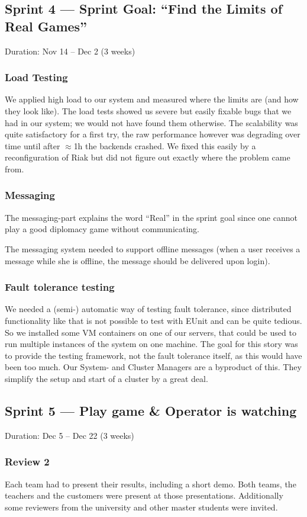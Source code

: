 \documentclass[11pt,a4paper]{report}
\begin{document}
\subsection*{Sprint 4 --- Sprint Goal: ``Find the Limits of Real Games''}
Duration: Nov 14 -- Dec 2 (3 weeks)
\subsubsection{Load Testing}
We applied high load to our system and measured where the limits are (and how
they look like). The load tests showed us severe but easily fixable bugs that we
had in our system; we would not have found them otherwise. The scalability was
quite satisfactory for a first try, the raw performance however was degrading
over time until after $\approx$1h the backends crashed. We fixed this easily by
a reconfiguration of Riak but did not figure out exactly where the problem came
from.
\subsubsection{Messaging}
The messaging-part explains the word ``Real'' in the sprint goal since one
cannot play a good diplomacy game without communicating.

The messaging system needed to support offline messages (when a user receives a
message while she is offline, the message should be delivered upon login).
\subsubsection{Fault tolerance testing}
We needed a (semi-) automatic way of testing fault tolerance, since distributed
functionality like that is not possible to test with EUnit and can be quite
tedious. So we installed some VM containers on one of our servers, that could be
used to run multiple instances of the system on one machine. The goal for this
story was to provide the testing framework, not the fault tolerance itself, as
this would have been too much. Our System- and Cluster Managers are a byproduct
of this. They simplify the setup and start of a cluster by a great deal.

\subsection*{Sprint 5 --- Play game \& Operator is watching}
Duration: Dec 5 -- Dec 22 (3 weeks)
\subsubsection{Review 2}
Each team had to present their results, including a short demo. Both teams, the
teachers and the customers were present at those presentations. Additionally
some reviewers from the university and other master students were invited.
\end{document}
